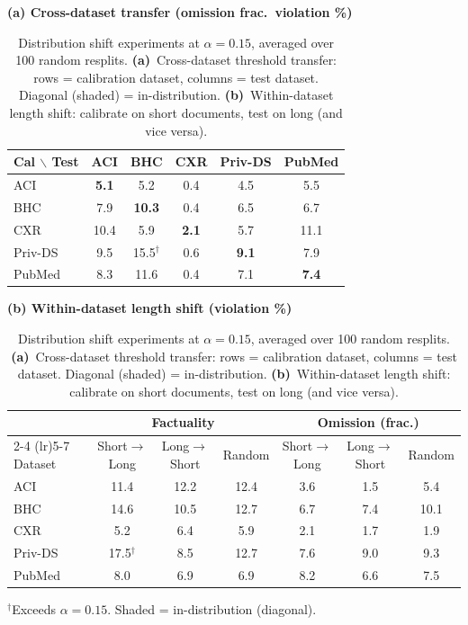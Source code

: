\begin{table}[t]
\centering
\small
\caption{Distribution shift experiments at $\alpha=0.15$, averaged over 100 random resplits. \textbf{(a)}~Cross-dataset threshold transfer: rows = calibration dataset, columns = test dataset. Diagonal (shaded) = in-distribution. \textbf{(b)}~Within-dataset length shift: calibrate on short documents, test on long (and vice versa).}
\label{tab:distribution-shift}
\vspace{4pt}
\textbf{(a) Cross-dataset transfer (omission frac.\ violation \%)}
\vspace{2pt}
\begin{tabular}{l ccccc}
\toprule
Cal $\backslash$ Test & ACI & BHC & CXR & Priv-DS & PubMed \\
\midrule
  ACI & \cellcolor{gray!20}\textbf{5.1} & 5.2 & 0.4 & 4.5 & 5.5 \\
  BHC & 7.9 & \cellcolor{gray!20}\textbf{10.3} & 0.4 & 6.5 & 6.7 \\
  CXR & 10.4 & 5.9 & \cellcolor{gray!20}\textbf{2.1} & 5.7 & 11.1 \\
  Priv-DS & 9.5 & 15.5$^\dagger$ & 0.6 & \cellcolor{gray!20}\textbf{9.1} & 7.9 \\
  PubMed & 8.3 & 11.6 & 0.4 & 7.1 & \cellcolor{gray!20}\textbf{7.4} \\
\bottomrule
\end{tabular}
\vspace{8pt}

\textbf{(b) Within-dataset length shift (violation \%)}
\vspace{2pt}
\begin{tabular}{l ccc ccc}
\toprule
 & \multicolumn{3}{c}{Factuality} & \multicolumn{3}{c}{Omission (frac.)} \\
\cmidrule(lr){2-4} \cmidrule(lr){5-7}
Dataset & Short$\to$Long & Long$\to$Short & Random & Short$\to$Long & Long$\to$Short & Random \\
\midrule
  ACI & 11.4 & 12.2 & 12.4 & 3.6 & 1.5 & 5.4 \\
  BHC & 14.6 & 10.5 & 12.7 & 6.7 & 7.4 & 10.1 \\
  CXR & 5.2 & 6.4 & 5.9 & 2.1 & 1.7 & 1.9 \\
  Priv-DS & 17.5$^\dagger$ & 8.5 & 12.7 & 7.6 & 9.0 & 9.3 \\
  PubMed & 8.0 & 6.9 & 6.9 & 8.2 & 6.6 & 7.5 \\
\bottomrule
\end{tabular}
\vspace{2pt}
\par\small $^\dagger$Exceeds $\alpha=0.15$. Shaded = in-distribution (diagonal).
\end{table}